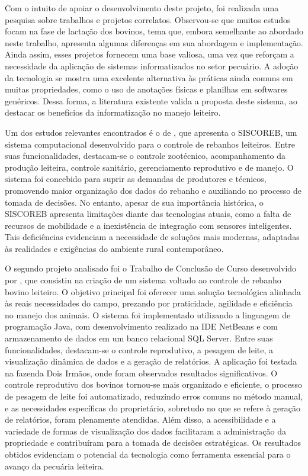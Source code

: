 Com o intuito de apoiar o desenvolvimento deste projeto, foi realizada uma pesquisa sobre trabalhos e projetos correlatos. Observou-se que muitos estudos focam na fase de lactação dos bovinos, tema que, embora semelhante ao abordado neste trabalho, apresenta algumas diferenças em sua abordagem e implementação. Ainda assim, esses projetos fornecem uma base valiosa, uma vez que reforçam a necessidade da aplicação de sistemas informatizados no setor pecuário. A adoção da tecnologia se mostra uma excelente alternativa às práticas ainda comuns em muitas propriedades, como o uso de anotações físicas e planilhas em softwares genéricos. Dessa forma, a literatura existente valida a proposta deste sistema, ao destacar os benefícios da informatização no manejo leiteiro.

Um dos estudos relevantes encontrados é o de \cite{Carlos1995}, que apresenta o SISCOREB, um sistema computacional desenvolvido para o controle de rebanhos leiteiros. Entre suas funcionalidades, destacam-se o controle zootécnico, acompanhamento da produção leiteira, controle sanitário, gerenciamento reprodutivo e de manejo. O sistema foi concebido para suprir as demandas de produtores e técnicos, promovendo maior organização dos dados do rebanho e auxiliando no processo de tomada de decisões. No entanto, apesar de sua importância histórica, o SISCOREB apresenta limitações diante das tecnologias atuais, como a falta de recursos de mobilidade e a inexistência de integração com sensores inteligentes. Tais deficiências evidenciam a necessidade de soluções mais modernas, adaptadas às realidades e exigências do ambiente rural contemporâneo.

O segundo projeto analisado foi o Trabalho de Conclusão de Curso desenvolvido por \cite{Pamella2017}, que consistiu na criação de um sistema voltado ao controle de rebanho bovino leiteiro. O objetivo principal foi oferecer uma solução tecnológica alinhada às reais necessidades do campo, prezando por praticidade, agilidade e eficiência no manejo dos animais. O sistema foi implementado utilizando a linguagem de programação Java, com desenvolvimento realizado na IDE NetBeans e com armazenamento de dados em um banco relacional SQL Server. Entre suas funcionalidades, destacam-se o controle reprodutivo, a pesagem de leite, a visualização dinâmica de dados e a geração de relatórios. A aplicação foi testada na fazenda Dois Irmãos, onde foram observados resultados significativos. O controle reprodutivo dos bovinos tornou-se mais organizado e eficiente, o processo de pesagem de leite foi automatizado, reduzindo erros comuns no método manual, e as necessidades específicas do proprietário, sobretudo no que se refere à geração de relatórios, foram plenamente atendidas. Além disso, a acessibilidade e a variedade de formas de visualização dos dados facilitaram a administração da propriedade e contribuíram para a tomada de decisões estratégicas. Os resultados obtidos evidenciam o potencial da tecnologia como ferramenta essencial para o avanço da pecuária leiteira.

